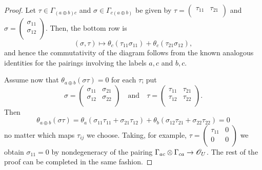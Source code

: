 \begin{proof}
Let $\tau \in \Gamma_{(a\oplus b)c}$ and $\sigma \in \Gamma_{c(a\oplus b)}$ be given by $\tau =\left (\begin{smallmatrix} \tau_{11} & \tau_{21} \\ \end{smallmatrix} \right )$ and $\sigma =\left (\begin{smallmatrix} \sigma_{11} \\ \sigma_{12} \\ \end{smallmatrix} \right )$. Then, the bottom row is
$$(\sigma ,\tau) \longmapsto \theta_c(\tau_{11}\sigma_{11})+\theta_c(\tau_{21}\sigma_{12}),$$
and hence the commutativity of the diagram follows from the known analogous identities for the pairings involving the labels $a,c$ and $b,c$.

Assume now that $\theta_{a\oplus b}(\sigma \tau )=0$ for each $\tau$; put
$$\sigma =\left (\begin{smallmatrix} \sigma_{11} & \sigma_{21} \\ \sigma_{12} & \sigma_{22} \\ \end{smallmatrix} \right )\quad \text{and} \quad \tau =\left (\begin{smallmatrix} \tau_{11} & \tau_{21} \\ \tau_{12} & \tau_{22} \\ \end{smallmatrix} \right ).$$
Then
$$\theta_{a\oplus b}(\sigma \tau )=\theta_a(\sigma_{11}\tau_{11}+\sigma_{21}\tau_{12})+\theta_b(\sigma_{12}\tau_{21}+\sigma_{22}\tau_{22})=0$$
no matter which maps $\tau_{ij}$ we choose. Taking, for example, $\tau =\left (\begin{smallmatrix} \tau_{11} & 0 \\ 0 & 0 \\ \end{smallmatrix} \right )$ we obtain $\sigma_{11}=0$ by nondegeneracy of the pairing $\Gamma_{ac}\otimes \Gamma_{ca}\to \mathscr{O}_U$. The rest of the proof can be completed in the same fashion.
\end{proof}

